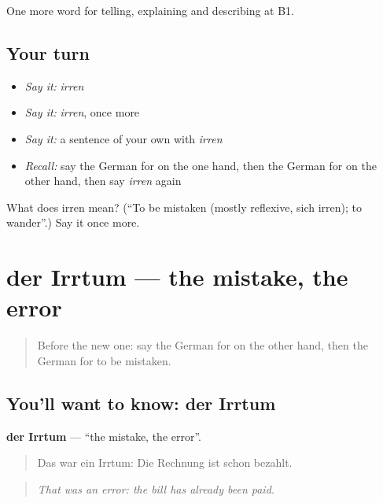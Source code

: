 \begin{grammarlens}[title={What you've built}]
One more word for telling, explaining and describing at B1.
\end{grammarlens}

\subsection*{Your turn}
\begin{itemize}
\raggedright
  \item \emph{Say it:} \emph{irren}
  \item \emph{Say it:} \emph{irren}, once more
  \item \emph{Say it:} a sentence of your own with \emph{irren}
  \item \emph{Recall:} say the German for on the one hand, then the German for on the other hand, then say \emph{irren} again
\end{itemize}

\begin{tcolorbox}[breakable,colback=teal!4,colframe=teal!35!black,title={Before you move on}]
What does irren mean? (\textquotedblleft{}To be mistaken (mostly reflexive, sich irren); to wander\textquotedblright{}.) Say it once more.
\end{tcolorbox}
\section[der Irrtum]{der Irrtum — the mistake, the error}

\label{lesson:GE-C337-irrtum}



\begin{quote}
Before the new one: say the German for on the other hand, then the German for to be mistaken.
\end{quote}

\subsection*{You'll want to know: der Irrtum}
\textbf{der Irrtum} — \textquotedblleft{}the mistake, the error\textquotedblright{}.

\begin{quote}
Das war ein Irrtum: Die Rechnung ist schon bezahlt.
\end{quote}

\begin{quote}
\emph{That was an error: the bill has already been paid.}
\end{quote}

